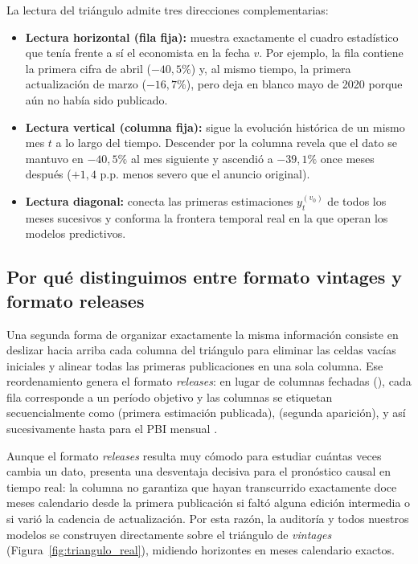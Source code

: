 \documentclass[12pt,letterpaper]{article}
\begin{document}
La lectura del triángulo admite tres direcciones complementarias:
\begin{itemize}
  \item \textbf{Lectura horizontal (fila fija):} muestra exactamente el cuadro estadístico que tenía frente a sí el economista en la fecha \(v\). Por ejemplo, la fila  contiene la primera cifra de abril (\(-40{,}5\%\)) y, al mismo tiempo, la primera actualización de marzo (\(-16{,}7\%\)), pero deja en blanco mayo de 2020 porque aún no había sido publicado.
  \item \textbf{Lectura vertical (columna fija):} sigue la evolución histórica de un mismo mes \(t\) a lo largo del tiempo. Descender por la columna  revela que el dato se mantuvo en \(-40{,}5\%\) al mes siguiente y ascendió a \(-39{,}1\%\) once meses después (\(+1{,}4\) p.p. menos severo que el anuncio original).
  \item \textbf{Lectura diagonal:} conecta las primeras estimaciones \(y_t^{(v_0)}\) de todos los meses sucesivos y conforma la frontera temporal real en la que operan los modelos predictivos.
\end{itemize}

\subsection{Por qué distinguimos entre formato vintages y formato releases}

Una segunda forma de organizar exactamente la misma información consiste en deslizar hacia arriba cada columna del triángulo para eliminar las celdas vacías iniciales y alinear todas las primeras publicaciones en una sola columna. Ese reordenamiento genera el formato \emph{releases}: en lugar de columnas fechadas (), cada fila corresponde a un período objetivo y las columnas se etiquetan secuencialmente como  (primera estimación publicada),  (segunda aparición), y así sucesivamente hasta  para el PBI mensual \parencite{cruz2025}.

Aunque el formato \emph{releases} resulta muy cómodo para estudiar cuántas veces cambia un dato, presenta una desventaja decisiva para el pronóstico causal en tiempo real: la columna  no garantiza que hayan transcurrido exactamente doce meses calendario desde la primera publicación si faltó alguna edición intermedia o si varió la cadencia de actualización. Por esta razón, la auditoría y todos nuestros modelos se construyen directamente sobre el triángulo de \emph{vintages} (Figura~\ref{fig:triangulo_real}), midiendo horizontes en meses calendario exactos.
\end{document}
